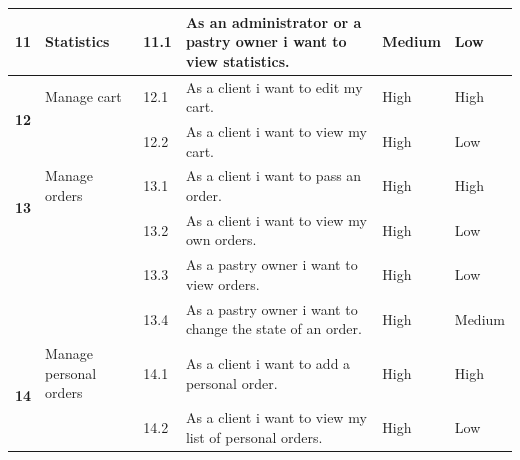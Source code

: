 \documentclass[12pt,a4paper]{report}
\begin{document}
\begin{table}[H]
\begin{center}
\begin{tabular}{|  p{1cm}|  p{4cm}|  p{1cm}| p{5cm}|  p{2cm}| p{2cm}|}
			
				\\ \hline
				\multirow{2}{*}{\textbf{11} }
				&                        
				Statistics &                        
				11.1 &                        
				As an administrator or a pastry owner i want to view statistics.&                        
				Medium &                        
				Low
				
				\\ \hline
				\multirow{2}{*}{\textbf{12} }
				&                        
				Manage cart &                        
				12.1 &                        
				As a client i want to edit my cart.&                        
				High &                        
				High
				\\
				\cline{3-6}
				&                        
				&                        
				12.2 &                        
				As a client i want to view my cart.&                        
				High &                        
				Low
					\\ \hline
				\multirow{2}{*}{\textbf{13} }
				&                        
				Manage orders &                        
				13.1 &                        
				As a client i want to pass an order.&                        
				High &                        
				High
				\\
				\cline{3-6}
				&                        
				&                        
				13.2 &                        
				As a client i want to view my own orders.&                        
				High &                        
				Low
				\\
				\cline{3-6}
				&                        
				&                        
				13.3 &                        
				As a pastry owner i want to view orders.&                        
				High &                        
				Low
				\\
				\cline{3-6}
				&                        
				&                        
				13.4 &                        
				As a pastry owner i want to change the state of an order.&                        
				High &                        
				Medium
				
				\\
				\hline
				\multirow{2}{*}{\textbf{14} }
				&                        
				Manage personal orders &                        
				14.1 &                        
				As a client i want to add a personal order.&                        
				High &                        
				High
				\\
				\cline{3-6}
				&                        
				&                        
				14.2 &                        
				As a client i want to view my list of personal orders.&                        
				High &                        
				Low
				
				
				
				\\
				\hline
			\end{tabular}
			
		\end{center}
	\end{table}
	\clearpage
\end{document}
